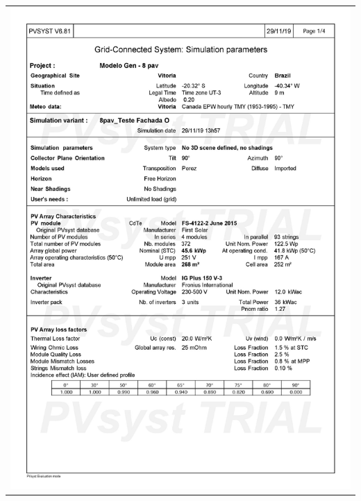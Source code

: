 \begin{table}[H]
    \centering
    \begin{tabular}{l}
        \includegraphics[width=\textwidth]{figures/attachments/resultpv7.jpg}
    \end{tabular}
\end{table}
\pagebreak
